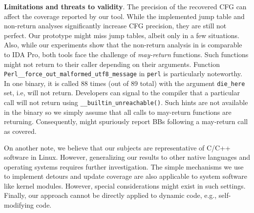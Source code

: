 \textbf{Limitations and threats to validity}.
The precision of the recovered CFG can affect the coverage reported by our tool.
While the implemented jump table and non-return analyses significantly increase CFG precision, 
they are still not perfect.
Our prototype might miss jump tables, albeit only in a few situations.
Also, while our experiments show that the non-return analysis in {\bcov} is comparable to IDA Pro, both tools face the challenge of \textit{may-return} functions.
Such functions might not return to their caller depending on their arguments.
Function \texttt{Perl\_\_force\_out\_malformed\_utf8\_message} in \texttt{perl} is particularly noteworthy.
In one binary, it is called 88 times (out of 89 total) with the argument \texttt{die\_here} set, i.e, will not return.
Developers can signal to the compiler that a particular call will not return using  \texttt{\_\_builtin\_unreachable()}.
Such hints are not available in the binary so we simply assume that all calls to may-return functions are returning.
Consequently, {\bcov} might spuriously report BBs following a may-return call as covered.


On another note, we believe that our subjects are representative of C/C++ software in Linux.
However, generalizing our results to other native languages and operating systems requires further investigation.
The simple mechanisms we use to implement detours and update coverage are also applicable to system software like kernel modules. 
However, special considerations might exist in such settings.
Finally, our approach cannot be directly applied to dynamic code, e.g., self-modifying code.


